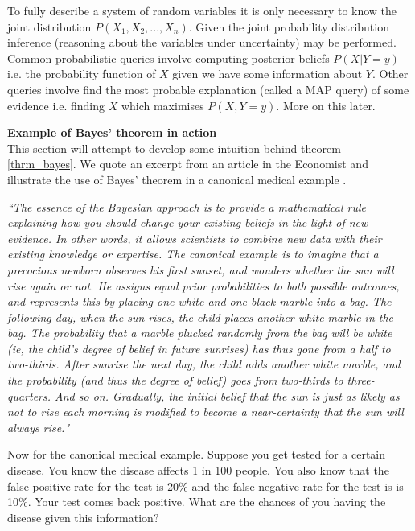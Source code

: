 To fully describe a system of random variables it is only necessary to know the joint distribution $P(X_1,X_2,...,X_n)$. Given the joint probability distribution inference (reasoning about the variables under uncertainty) may be performed. Common probabilistic queries involve computing posterior beliefs $P(X|Y=y)$ i.e. the probability function of $X$ given we have some information about $Y$. Other queries involve find the most probable explanation (called a MAP query) of some evidence i.e. finding $X$ which maximises $P(X, Y=y)$. More on this later. 

\textbf{Example of Bayes' theorem in action}\\
This section will attempt to develop some intuition behind theorem \ref{thrm_bayes}. We quote an excerpt from an article in the Economist \cite{eco1} and illustrate the use of Bayes' theorem in a canonical medical example \cite{korb}.

\textit{``The essence of the Bayesian approach is to provide a mathematical rule explaining how you should change your existing beliefs in the light of new evidence. In other words, it allows scientists to combine new data with their existing knowledge or expertise. The canonical example is to imagine that a precocious newborn observes his first sunset, and wonders whether the sun will rise again or not. He assigns equal prior probabilities to both possible outcomes, and represents this by placing one white and one black marble into a bag. The following day, when the sun rises, the child places another white marble in the bag. The probability that a marble plucked randomly from the bag will be white (ie, the child's degree of belief in future sunrises) has thus gone from a half to two-thirds. After sunrise the next day, the child adds another white marble, and the probability (and thus the degree of belief) goes from two-thirds to three-quarters. And so on. Gradually, the initial belief that the sun is just as likely as not to rise each morning is modified to become a near-certainty that the sun will always rise."}

Now for the canonical medical example. Suppose you get tested for a certain disease. You know the disease affects 1 in 100 people. You also know that the false positive rate for the test is 20\% and the false negative rate for the test is is 10\%. Your test comes back positive. What are the chances of you having the disease given this information?

